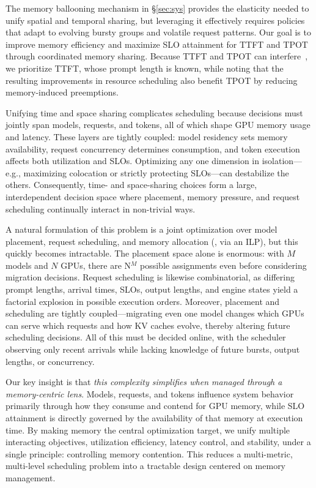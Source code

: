\label{sec:scheduling}

The memory ballooning mechanism in \S\ref{sec:sys} provides the elasticity needed to unify spatial and temporal sharing, but leveraging it effectively requires policies that adapt to evolving bursty groups and volatile request patterns. Our goal is to improve memory efficiency and maximize SLO attainment for TTFT and TPOT through coordinated memory sharing. Because TTFT and TPOT can interfere~\cite{zhong2024distserve}, we prioritize TTFT, whose prompt length is known, while noting that the resulting improvements in resource scheduling also benefit TPOT by reducing memory-induced preemptions.

Unifying time and space sharing complicates scheduling because decisions must jointly span models, requests, and tokens, all of which shape GPU memory usage and latency. These layers are tightly coupled: model residency sets memory availability, request concurrency determines consumption, and token execution affects both utilization and SLOs. Optimizing any one dimension in isolation—e.g., maximizing colocation or strictly protecting SLOs—can destabilize the others. Consequently, time- and space-sharing choices form a large, interdependent decision space where placement, memory pressure, and request scheduling continually interact in non-trivial ways.

A natural formulation of this problem is a joint optimization over model placement, request scheduling, and memory allocation (\eg, via an ILP), but this quickly becomes intractable. The placement space alone is enormous: with 
$M$ models and $N$ GPUs, there are N$^M$
 possible assignments even before considering migration decisions. Request scheduling is likewise combinatorial, as differing prompt lengths, arrival times, SLOs, output lengths, and engine states yield a factorial explosion in possible execution orders. Moreover, placement and scheduling are tightly coupled—migrating even one model changes which GPUs can serve which requests and how KV caches evolve, thereby altering future scheduling decisions. All of this must be decided online, with the scheduler observing only recent arrivals while lacking knowledge of future bursts, output lengths, or concurrency.

 Our key insight is that \emph{this complexity simplifies when managed through a memory-centric lens}. Models, requests, and tokens influence system behavior primarily through how they consume and contend for GPU memory, while SLO attainment is directly governed by the availability of that memory at execution time. By making memory the central optimization target, we unify multiple interacting objectives, utilization efficiency, latency control, and stability, under a single principle: controlling memory contention. This reduces a multi-metric, multi-level scheduling problem into a tractable design centered on memory management.

